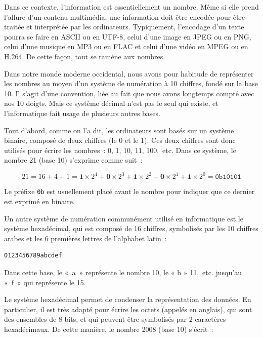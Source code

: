 Dans ce contexte, l'information est essentiellement un nombre. Même si elle prend l'allure d'un contenu multimédia, une information doit être encodée pour être traitée et interprétée par les ordinateurs. Typiquement, l'encodage d'un texte pourra se faire en ASCII ou en UTF-8, celui d'une image en JPEG ou en PNG, celui d'une musique en MP3 ou en FLAC et celui d'une vidéo en MPEG ou en H.264. De cette façon, tout se ramène aux nombres.

Dans notre monde moderne occidental, nous avons pour habitude de représenter les nombres au moyen d'un système de numération à 10 chiffres, fondé sur la base 10. Il s'agit d'une convention, liée au fait que nous avons longtemps compté avec nos 10 doigts. Mais ce système décimal n'est pas le seul qui existe, et l'informatique fait usage de plusieurs autres bases.

Tout d'abord, comme on l'a dit, les ordinateurs sont basés sur un système binaire, composé de deux chiffres (le 0 et le 1). Ces deux chiffres sont donc utilisés pour écrire les nombres~: 0, 1, 10, 11, 100,~etc. Dans ce système, le nombre 21 (base 10) s'exprime comme suit~:

{ \small
\[
21 = 16 + 4 + 1 = \mathbf{1} \times 2^4 + \mathbf{0} \times 2^3 + \mathbf{1} \times 2^2 + \mathbf{0} \times 2^1 + \mathbf{1} \times 2^0 = \mathtt{0b10101}
\]
}

Le préfixe \texttt{0b} est usuellement placé avant le nombre pour indiquer que ce dernier est exprimé en binaire.


Un autre système de numération communément utilisé en informatique est le système hexadécimal, qui est composé de 16 chiffres, symbolisés par les 10 chiffres arabes et les 6 premières lettres de l'alphabet latin~: 

\begin{Verbatim}[fontsize=\small]
0123456789abcdef
\end{Verbatim}

Dans cette base, le «~a~» représente le nombre 10, le « b » 11,~etc. jusqu'au «~f~» qui représente le 15.

Le système hexadécimal permet de condenser la représentation des données. En particulier, il est très adapté pour écrire les octets (appelés  en anglais), qui sont des ensembles de 8 bits, et qui peuvent être symbolisés par 2 caractères hexadécimaux. De cette manière, le nombre 2008 (base 10) s'écrit~:

